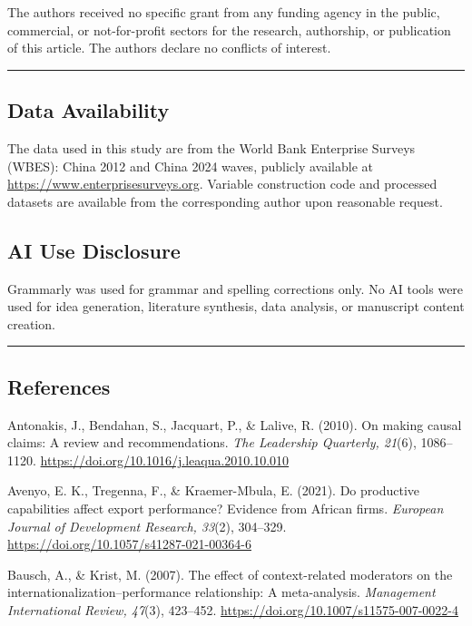 \documentclass[12pt,a4paper]{article}
\begin{document}
The authors received no specific grant from any funding agency in the
public, commercial, or not-for-profit sectors for the research,
authorship, or publication of this article. The authors declare no
conflicts of interest.

\begin{center}\rule{0.5\linewidth}{0.5pt}\end{center}

\hypertarget{data-availability}{%
\subsection{Data Availability}\label{data-availability}}

The data used in this study are from the World Bank Enterprise Surveys
(WBES): China 2012 and China 2024 waves, publicly available at
\url{https://www.enterprisesurveys.org}. Variable construction code and
processed datasets are available from the corresponding author upon
reasonable request.

\hypertarget{ai-use-disclosure}{%
\subsection{AI Use Disclosure}\label{ai-use-disclosure}}

Grammarly was used for grammar and spelling corrections only. No AI
tools were used for idea generation, literature synthesis, data
analysis, or manuscript content creation.

\begin{center}\rule{0.5\linewidth}{0.5pt}\end{center}

\hypertarget{references}{%
\subsection{References}\label{references}}

Antonakis, J., Bendahan, S., Jacquart, P., \& Lalive, R. (2010). On
making causal claims: A review and recommendations. \emph{The Leadership
Quarterly, 21}(6), 1086--1120.
\url{https://doi.org/10.1016/j.leaqua.2010.10.010}

Avenyo, E. K., Tregenna, F., \& Kraemer-Mbula, E. (2021). Do productive
capabilities affect export performance? Evidence from African firms.
\emph{European Journal of Development Research, 33}(2), 304--329.
\url{https://doi.org/10.1057/s41287-021-00364-6}

Bausch, A., \& Krist, M. (2007). The effect of context-related
moderators on the internationalization--performance relationship: A
meta-analysis. \emph{Management International Review, 47}(3), 423--452.
\url{https://doi.org/10.1007/s11575-007-0022-4}
\end{document}
